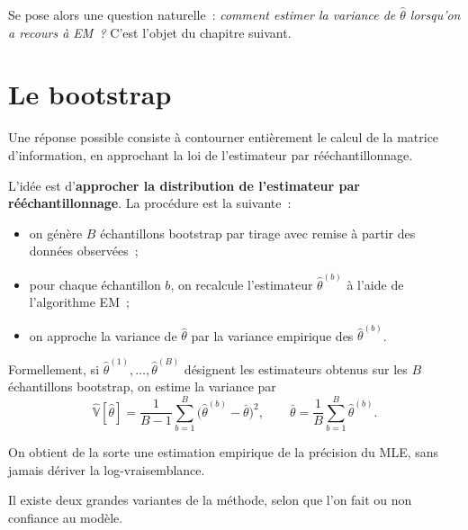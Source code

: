 Se pose alors une question naturelle~: \textit{comment estimer la variance de
$\hat{\theta}$ lorsqu'on a recours à EM~?} C'est l'objet du chapitre suivant.

\chapter{Le bootstrap}

Une réponse possible consiste à contourner entièrement le calcul de la matrice
d'information, en approchant la loi de l'estimateur par rééchantillonnage.

\begin{principe}[Bootstrap]
L'idée est d'\textbf{approcher la distribution de l'estimateur par
rééchantillonnage}. La procédure est la suivante~:
\begin{itemize}
  \item on génère $B$ échantillons bootstrap par tirage avec remise à partir des
        données observées~;
  \item pour chaque échantillon $b$, on recalcule l'estimateur $\hat{\theta}^{(b)}$
        à l'aide de l'algorithme EM~;
  \item on approche la variance de $\hat{\theta}$ par la variance empirique des
        $\hat{\theta}^{(b)}$.
\end{itemize}
\end{principe}

Formellement, si $\hat{\theta}^{(1)}, \dots, \hat{\theta}^{(B)}$ désignent les
estimateurs obtenus sur les $B$ échantillons bootstrap, on estime la variance par
$$
\hat{\mathbb{V}}[\hat{\theta}]
  = \frac{1}{B-1} \sum_{b=1}^{B}
    \big(\hat{\theta}^{(b)} - \bar{\theta}\big)^2,
\qquad
\bar{\theta} = \frac{1}{B} \sum_{b=1}^{B} \hat{\theta}^{(b)} .
$$

On obtient de la sorte une estimation empirique de la précision du MLE, sans
jamais dériver la log-vraisemblance.

Il existe deux grandes variantes de la méthode, selon que l'on fait ou non
confiance au modèle.

\medskip

